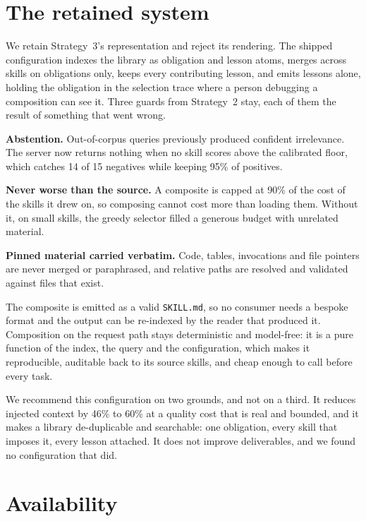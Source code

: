 \documentclass[11pt]{article}
\begin{document}
\section{The retained system}
\label{sec:retained}

We retain Strategy~3's representation and reject its rendering. The shipped configuration indexes
the library as obligation and lesson atoms, merges across skills on obligations only, keeps every
contributing lesson, and emits lessons alone, holding the obligation in the selection trace where a
person debugging a composition can see it. Three guards from Strategy~2 stay, each of them the
result of something that went wrong.

\textbf{Abstention.} Out-of-corpus queries previously produced confident irrelevance. The server now
returns nothing when no skill scores above the calibrated floor, which catches 14 of 15 negatives
while keeping 95\% of positives.

\textbf{Never worse than the source.} A composite is capped at 90\% of the cost of the skills it
drew on, so composing cannot cost more than loading them. Without it, on small skills, the greedy
selector filled a generous budget with unrelated material.

\textbf{Pinned material carried verbatim.} Code, tables, invocations and file pointers are never
merged or paraphrased, and relative paths are resolved and validated against files that exist.

The composite is emitted as a valid \texttt{SKILL.md}, so no consumer needs a bespoke format and the
output can be re-indexed by the reader that produced it. Composition on the request path stays
deterministic and model-free: it is a pure function of the index, the query and the configuration,
which makes it reproducible, auditable back to its source skills, and cheap enough to call before
every task.

We recommend this configuration on two grounds, and not on a third. It reduces injected context by
46\% to 60\% at a quality cost that is real and bounded, and it makes a library de-duplicable and
searchable: one obligation, every skill that imposes it, every lesson attached. It does not improve
deliverables, and we found no configuration that did.

\section{Availability}
\label{sec:avail}
\end{document}
